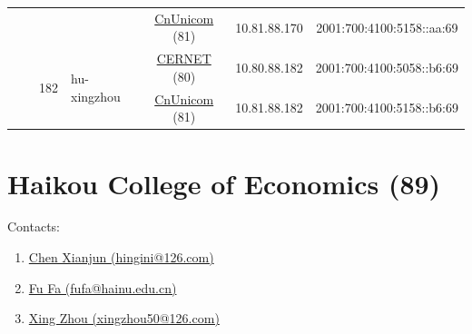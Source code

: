 \begin{small}
\begin{center}
\begin{longtable}{|c|c|c|c|c|c|c|c|}
  &  &  &  & \multicolumn{2}{|c|}{\tiny{\href{http://www.chinaunicom.com}{CnUnicom} (81)}} & \tiny{10.81.88.170} & \tiny{2001:700:4100:5158::aa:69} \\* \cline{3-3}\cline{4-4}\cline{5-5}\cline{6-6}\cline{7-7}\cline{8-8}
  &  & \multirow{2}{*}{\tiny{182}} & \multicolumn{1}{|l|}{\multirow{2}{*}{\tiny{hu-xingzhou}}} & \multicolumn{2}{|c|}{\tiny{\href{http://www.cernet.edu.cn}{CERNET} (80)}} & \tiny{10.80.88.182} & \tiny{2001:700:4100:5058::b6:69} \\* \cline{5-5}\cline{6-6}\cline{7-7}\cline{8-8}
  &  &  &  & \multicolumn{2}{|c|}{\tiny{\href{http://www.chinaunicom.com}{CnUnicom} (81)}} & \tiny{10.81.88.182} & \tiny{2001:700:4100:5158::b6:69} \\ \hline
\end{longtable}
\end{center}
\end{small}



\section{Haikou College of Economics (89)}
\label{sec:HKC}

Contacts:\begin{enumerate}
 \item {}\href{mailto:hingini@126.com}{Chen Xianjun (hingini@126.com)}
 \item {}\href{mailto:fufa@hainu.edu.cn}{Fu Fa (fufa@hainu.edu.cn)}
 \item {}\href{mailto:xingzhou50@126.com}{Xing Zhou (xingzhou50@126.com)}
\end{enumerate}

